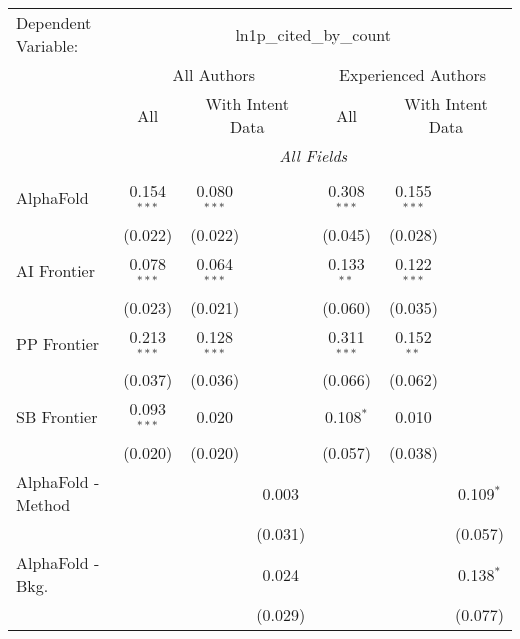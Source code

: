 \begingroup
\centering
\begin{tabular}{lcccccc}
   \tabularnewline \midrule \midrule
   Dependent Variable: & \multicolumn{6}{c}{ln1p\_cited\_by\_count}\\
 & \multicolumn{3}{c}{All Authors} & \multicolumn{3}{c}{Experienced Authors} \\
\cmidrule(lr){2-4} \cmidrule(lr){5-7}
 & \multicolumn{1}{c}{All} & \multicolumn{2}{c}{With Intent Data} & \multicolumn{1}{c}{All} & \multicolumn{2}{c}{With Intent Data} \\
\cmidrule(lr){2-2} \cmidrule(lr){3-4} \cmidrule(lr){5-5} \cmidrule(lr){6-7}
 & \multicolumn{6}{c}{\textit{All Fields}} \\ \\
   AlphaFold            & 0.154$^{***}$ & 0.080$^{***}$ &                & 0.308$^{***}$ & 0.155$^{***}$ &   \\   
                        & (0.022)       & (0.022)       &                & (0.045)       & (0.028)       &   \\   
   AI Frontier          & 0.078$^{***}$ & 0.064$^{***}$ &                & 0.133$^{**}$  & 0.122$^{***}$ &   \\   
                        & (0.023)       & (0.021)       &                & (0.060)       & (0.035)       &   \\   
   PP Frontier          & 0.213$^{***}$ & 0.128$^{***}$ &                & 0.311$^{***}$ & 0.152$^{**}$  &   \\   
                        & (0.037)       & (0.036)       &                & (0.066)       & (0.062)       &   \\   
   SB Frontier          & 0.093$^{***}$ & 0.020         &                & 0.108$^{*}$   & 0.010         &   \\   
                        & (0.020)       & (0.020)       &                & (0.057)       & (0.038)       &   \\   
   AlphaFold - Method   &               &               & 0.003          &               &               & 0.109$^{*}$\\   
                        &               &               & (0.031)        &               &               & (0.057)\\   
   AlphaFold - Bkg.     &               &               & 0.024          &               &               & 0.138$^{*}$\\   
                        &               &               & (0.029)        &               &               & (0.077)\\   

\end{tabular}
